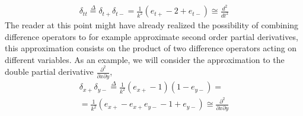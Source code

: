 \begin{equation}
\label{eqn:ddiff}
	\begin{aligned}
	\delta_{tt} \overset{\Delta}{=} \delta_{t+}\delta_{t-}=\frac{1}{k^2}(e_{t+}-2+e_{t-})\cong\frac{d^2}{dt^2}
	\end{aligned}
\end{equation}  
The reader at this point might have already realized the possibility of combining difference operators to for example approximate second order partial derivatives, this approximation consists on the product of two difference operators acting on different variables. As an example, we will consider the approximation to the double partial derivative $\frac{\partial^{2}}{\partial x \partial y}$,
\begin{equation}
	\begin{aligned}
	\delta_{x+}\delta_{y-}  \overset{\Delta}{=} \frac{1}{k^2} (e_{x+} -1) (1-e_{y-} )=\\
		=\frac{1}{k^2}(e_{x+}-e_{x+}e_{y-}-1+e_{y-}) \cong  \frac{\partial^2}{\partial x \partial y}
	\end{aligned}
\end{equation}


